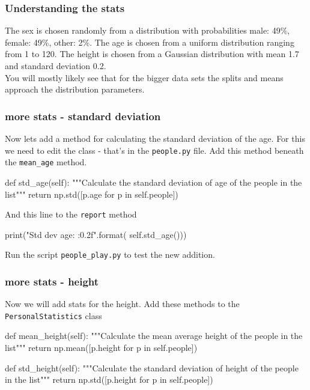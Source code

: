 \documentclass{beamer}
\begin{document}
\begin{frame}[fragile]
\frametitle{Understanding the stats}
The sex is chosen randomly from a distribution with probabilities 
male: 49\%, female: 49\%, other: 2\%.
The age is chosen from a uniform distribution ranging from 1 to 120.
The height is chosen from a Gaussian distribution with mean 1.7 and standard deviation 0.2.\\
\bigskip
You will mostly likely see that for the bigger data sets the splits and means approach the distribution parameters.

\end{frame}

\begin{frame}[fragile]
\frametitle{more stats - standard deviation}
Now lets add a method for calculating the standard deviation of the age.
For this we need to edit the class - that's in the \texttt{people.py} file.
Add this method beneath the \texttt{mean\_age} method.
\begin{shaded}
\begin{code} 
    def std_age(self):
        """Calculate the standard deviation
         of age of the people in the list"""
        return np.std([p.age for p in self.people])
\end{code}
\end{shaded}
And this line to the \texttt{report} method
\begin{shaded}
\begin{code} 
        print("Std dev age: {:0.2f}".format(
                                self.std_age()))
\end{code}
\end{shaded}
Run the script \texttt{people\_play.py} to test the new addition.

\end{frame}

\begin{frame}[fragile]
\frametitle{more stats - height}
Now we will add stats for the height.
Add these methods to the \texttt{PersonalStatistics} class
\begin{shaded}
\begin{code} 
    def mean_height(self):
        """Calculate the mean average height 
        of the people in the list"""
        return np.mean([p.height for p in self.people])
        
    def std_height(self):
        """Calculate the standard deviation of 
        height of the people in the list"""
        return np.std([p.height for p in self.people])
\end{code}
\end{shaded}
\end{frame}
\end{document}
